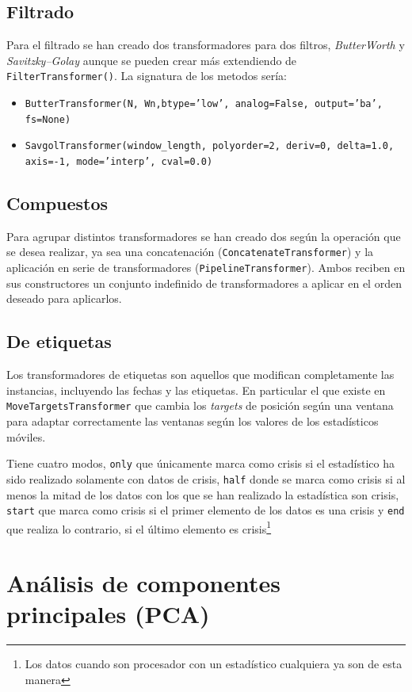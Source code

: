 \documentclass[a4paper,12pt,twoside,oldfontcommands]{memoir}
\begin{document}
\section{Filtrado}
Para el filtrado se han creado dos transformadores para dos filtros, \textit{ButterWorth} y \textit{Savitzky–Golay} aunque se pueden crear más extendiendo de \texttt{FilterTransformer()}. La signatura de los metodos sería:
\begin{itemize}
\item \texttt{ButterTransformer(N, Wn,btype='low', analog=False, output='ba', fs=None)}
\item \texttt{SavgolTransformer(window\_length, polyorder=2, deriv=0, delta=1.0, axis=-1, mode='interp', cval=0.0)}
\end{itemize}
\section{Compuestos}
Para agrupar distintos transformadores se han creado dos según la operación que se desea realizar, ya sea una concatenación (\texttt{ConcatenateTransformer}) y la aplicación en serie de transformadores (\texttt{PipelineTransformer}). Ambos reciben en sus constructores un conjunto indefinido de transformadores a aplicar en el orden deseado para aplicarlos.
\section{De etiquetas}
Los transformadores de etiquetas son aquellos que modifican completamente las instancias, incluyendo las fechas y las etiquetas. En particular el que existe en \texttt{MoveTargetsTransformer} que cambia los \textit{targets} de posición según una ventana para adaptar correctamente las ventanas según los valores de los estadísticos móviles.


Tiene cuatro modos, \texttt{only} que únicamente marca como crisis si el estadístico ha sido realizado solamente con datos de crisis, \texttt{half} donde se marca como crisis si al menos la mitad de los datos con los que se han realizado la estadística son crisis, \texttt{start} que marca como crisis si el primer elemento de los datos es una crisis y \texttt{end} que realiza lo contrario, si el último elemento es crisis\footnote{Los datos cuando son procesador con un estadístico cualquiera ya son de esta manera}
\chapter{Análisis de componentes principales (PCA)}
\end{document}
